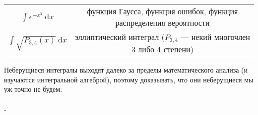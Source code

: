 \documentclass{article}
\begin{document}
\begin{itemize}
\begin{Example}
\begin{tabular}{|c|c|}
                $\int e^{-x^2}~\mathrm dx$ & функция Гаусса, функция ошибок, функция распределения вероятности\\
                $\int\sqrt{P_{3,4}(x)}~\mathrm dx$ & эллиптический интеграл ($P_{3,4}$ --- некий многочлен 3 либо 4 степени)\\
                \hline
            \end{tabular}
        \end{Example}
        \begin{Comment}
            Неберущиеся интегралы выходят далеко за пределы математического анализа (и изучаются интегральной алгеброй), поэтому доказывать, что они неберущиеся мы уж точно не будем.
        \end{Comment}
    \end{itemize}
    \paragraph{.}
\end{document}
